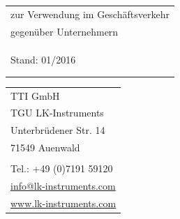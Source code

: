 \documentclass[a4paper, final, 11pt, oneside]{scrartcl}
\begin{document}
\vspace*{1pt}

  \begin{minipage}[l]{0.6\textwidth}
    \hspace*{-3.5mm}
    \footnotesize
    \begin{tabular}[t]{l@{}}
      zur Verwendung im Geschäftsverkehr\\
      gegenüber Unternehmern\\
      \\
      \\
      \\
      Stand: 01/2016\\
      \\
      \\
    \end{tabular}
    \footnotesize    
  \end{minipage}
  \hfill
  \begin{minipage}[c]{0.3\textwidth}
    \begin{flushright}
      \footnotesize
      \begin{tabular}[t]{l@{}}
      TTI GmbH\\
      TGU LK-Instruments\\
      Unterbrüdener Str. 14\\
      71549 Auenwald\\
      \\
      Tel.: +49 (0)7191 59120\\
      \href{mailto:info@lk-instruments.com}{info@lk-instruments.com}\\
      \href{http://www.lk-instruments.com}{www.lk-instruments.com}\\
    \end{tabular}
    \end{flushright}
  \end{minipage}
  
\vspace*{1pt}
\end{document}
